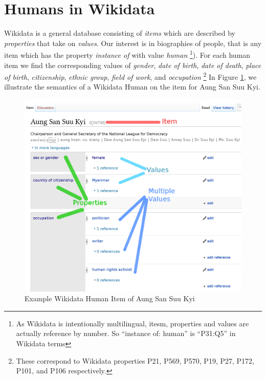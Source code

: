 \documentclass{sig-alternate-05-2015}
\begin{document}
\section{Humans in Wikidata}

Wikidata is a general database consisting of \textit{items} which are described by \textit{properties} that take on \textit{values}. Our interest is in biographies of people, that is any item which has the property \textit{instance of} with value \textit{human} \footnote{As Wikidata is intentionally multilingual, itesm, properties and values are actually reference by number. So ``instance of: human'' is ``P31:Q5'' in Wikidata terms }). For each human item we find the corresponding values of \textit{gender}, \textit{date of birth}, \textit{date of death}, \textit{place of birth}, \textit{citizenship}, \textit{ethnic group}, \textit{field of work}, and \textit{occupation} \footnote{These correspond to Wikidata properties P21, P569, P570, P19, P27, P172, P101, and P106 respectively.} In Figure \ref{fig:aung}, we illustrate the semantics of a Wikidata Human on the item for Aung San Suu Kyi.

\begin{figure}
\includegraphics[scale=0.2]{figures/aung_explainer_small.png} 
\caption{Example Wikidata Human Item of Aung San Suu Kyi}
\label{fig:aung}
\end{figure}
 
\end{document}
